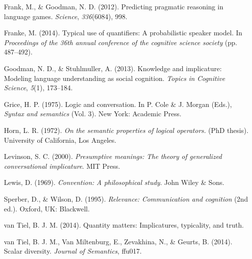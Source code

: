 \documentclass[10pt, letterpaper]{article}
\begin{document}
\hypertarget{ref-frank2012}{}
Frank, M., \& Goodman, N. D. (2012). Predicting pragmatic reasoning in
language games. \emph{Science}, \emph{336}(6084), 998.

\hypertarget{ref-franke2014}{}
Franke, M. (2014). Typical use of quantifiers: A probabilistic speaker
model. In \emph{Proceedings of the 36th annual conference of the
cognitive science society} (pp. 487--492).

\hypertarget{ref-goodman2013}{}
Goodman, N. D., \& Stuhlmuller, A. (2013). Knowledge and implicature:
Modeling language understanding as social cognition. \emph{Topics in
Cognitive Science}, \emph{5}(1), 173--184.

\hypertarget{ref-grice1975}{}
Grice, H. P. (1975). Logic and conversation. In P. Cole \& J. Morgan
(Eds.), \emph{Syntax and semantics} (Vol. 3). New York: Academic Press.

\hypertarget{ref-horn1972}{}
Horn, L. R. (1972). \emph{On the semantic properties of logical
operators.} (PhD thesis). University of California, Los Angeles.

\hypertarget{ref-levinson2000}{}
Levinson, S. C. (2000). \emph{Presumptive meanings: The theory of
generalized conversational implicature}. MIT Press.

\hypertarget{ref-lewis1969}{}
Lewis, D. (1969). \emph{Convention: A philosophical study}. John Wiley
\& Sons.

\hypertarget{ref-sperber1995}{}
Sperber, D., \& Wilson, D. (1995). \emph{Relevance: Communication and
cognition} (2nd ed.). Oxford, UK: Blackwell.

\hypertarget{ref-vantiel2014}{}
van Tiel, B. J. M. (2014). Quantity matters: Implicatures, typicality,
and truth.

\hypertarget{ref-vantiel2014b}{}
van Tiel, B. J. M., Van Miltenburg, E., Zevakhina, N., \& Geurts, B.
(2014). Scalar diversity. \emph{Journal of Semantics}, ffu017.
\end{document}
